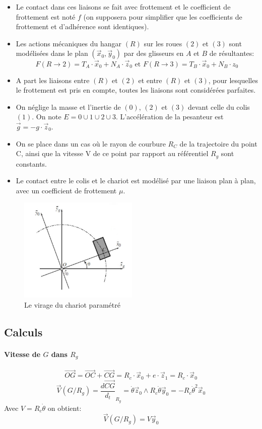 \begin{itemize}
	\item Le contact dans ces liaisons se fait avec frottement et le coefficient de frottement est noté $f$ (on supposera pour simplifier que les coefficients de frottement et d'adhérence sont identiques).
	\item Les actions mécaniques du hangar $(R)$ sur les roues $(2)$ et $(3)$ sont modélisées dans le plan $(\vec x_0, \vec y_0)$ par des glisseurs en $A$ et $B$ de résultantes: \[
			F(R\rightarrow 2) = T_A\cdot \vec x_0 + N_A \cdot \vec z_0 \text{ et } F(R\rightarrow 3) = T_B\cdot \vec x_0 + N_B\cdot z_0 \]
	\item A part les liaisons entre $(R)$ et $(2)$ et entre $(R)$ et $(3)$, pour lesquelles le frottement est pris en compte, toutes les liaisons sont considérées parfaites.
	\item On néglige la masse et l'inertie de $(0)$, $(2)$ et $(3)$ devant celle du colis $(1)$. On note $E = 0 \cup 1 \cup 2 \cup 3$. L'accélération de la pesanteur est $\vec g = -g \cdot \vec z_0$.
	\item On se place dans un cas où le rayon de courbure $R_C$ de la trajectoire du point C, ainsi que la vitesse V de ce point par rapport au référentiel $R_g$ sont constants.
	\item Le contact entre le colis et le chariot est modélisé par une liaison plan à plan, avec un coefficient de frottement $\mu$.
\end{itemize}
\begin{figure}
	\centering
	\includegraphics[height=5cm]{schema_chariot3}
	\caption{Le virage du chariot paramétré}
	\label{fig:schemaChariot3}
\end{figure}
\subsection{Calculs}
\paragraph{Vitesse de $G$ dans $R_g$}
\[\vec{OG} = \vec{OC} + \vec{CG} = R_c \cdot \vec x_0 + e\cdot \vec z_1 = R_c \cdot \vec x_0\]
\[\vec V(G/R_g) = \frac{d\vec{CG}}{d_t}_{R_g} = \dot \theta \vec z_0 \wedge R_c \dot \theta \vec y_0 = -R_c \dot \theta^2 \vec x_0 \]
Avec $ V = R_c \dot \theta$ on obtient:
\begin{equation}
	\vec V(G / R_g) =V \vec y_0
\end{equation}
